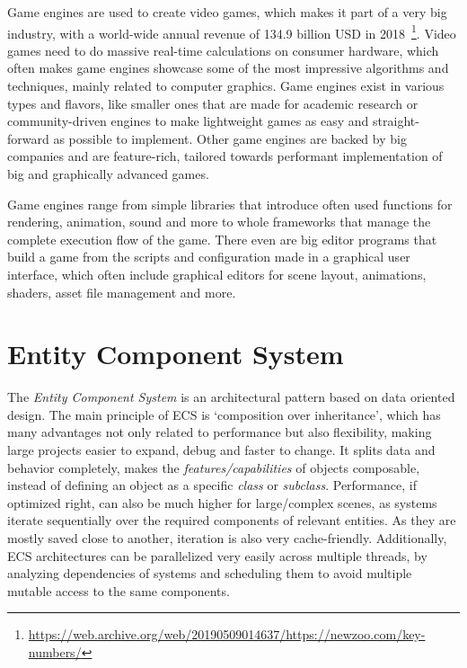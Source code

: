 
Game engines are used to create video games, which makes it part of a very big industry, with a world-wide annual revenue of 134.9 billion USD in 2018~\footnote{\url{https://web.archive.org/web/20190509014637/https://newzoo.com/key-numbers/}}. Video games need to do massive real-time calculations on consumer hardware, which often makes game engines showcase some of the most impressive algorithms and techniques, mainly related to computer graphics. Game engines exist in various types and flavors, like smaller ones that are made for academic research or community-driven engines to make lightweight games as easy and straight-forward as possible to implement. Other game engines are backed by big companies and are feature-rich, tailored towards performant implementation of big and graphically advanced games.

Game engines range from simple libraries that introduce often used functions for rendering, animation, sound and more to whole frameworks that manage the complete execution flow of the game. There even are big editor programs that build a game from the scripts and configuration made in a graphical user interface, which often include graphical editors for scene layout, animations, shaders, asset file management and more.

\section*{Entity Component System}

The \textit{Entity Component System} is an architectural pattern based on data oriented design. The main principle of ECS is `composition over inheritance', which has many advantages not only related to performance but also flexibility, making large projects easier to expand, debug and faster to change. It splits data and behavior completely, makes the \textit{features/capabilities} of objects composable, instead of defining an object as a specific \textit{class} or \textit{subclass}. Performance, if optimized right, can also be much higher for large/complex scenes, as systems iterate sequentially over the required components of relevant entities. As they are mostly saved close to another, iteration is also very cache-friendly. Additionally, ECS architectures can be parallelized very easily across multiple threads, by analyzing dependencies of systems and scheduling them to avoid multiple mutable access to the same components.

